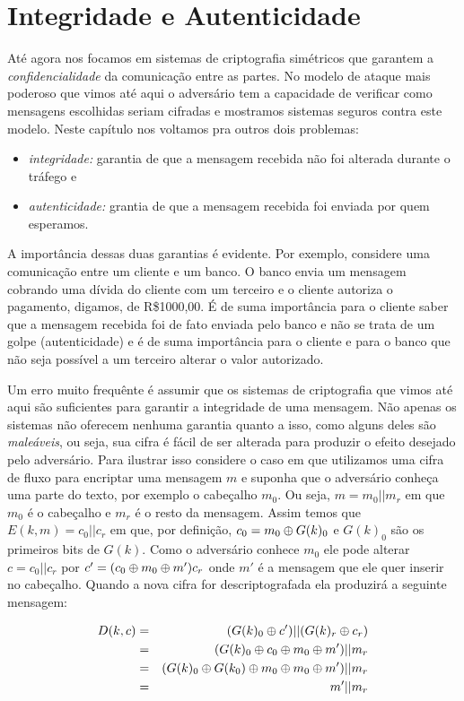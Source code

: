\chapter{Integridade e Autenticidade}
\label{cha:mac}
Até agora nos focamos em sistemas de criptografia simétricos que garantem a {\em confidencialidade} da comunicação entre as partes.
No modelo de ataque mais poderoso que vimos até aqui o adversário tem a capacidade de verificar como mensagens escolhidas seriam cifradas e mostramos sistemas seguros contra este modelo.
Neste capítulo nos voltamos pra outros dois problemas:
\begin{itemize}
\item {\em integridade:} garantia de que a mensagem recebida não foi alterada durante o tráfego e
\item {\em autenticidade:} grantia de que a mensagem recebida foi enviada por quem esperamos.
\end{itemize}

A importância dessas duas garantias é evidente.
Por exemplo, considere uma comunicação entre um cliente e um banco.
O banco envia um mensagem cobrando uma dívida do cliente com um terceiro e o cliente autoriza o pagamento, digamos, de R\$1000,00.
É de suma importância para o cliente saber que a mensagem recebida foi de fato enviada pelo banco e não se trata de um golpe (autenticidade) e é de suma importância para o cliente e para o banco que não seja possível a um terceiro alterar o valor autorizado.

Um erro muito frequênte é assumir que os sistemas de criptografia que vimos até aqui são suficientes para garantir a integridade de uma mensagem.
Não apenas os sistemas não oferecem nenhuma garantia quanto a isso, como alguns deles são {\em maleáveis}, ou seja, sua cifra é fácil de ser alterada para produzir o efeito desejado pelo adversário.
Para ilustrar isso considere o caso em que utilizamos uma cifra de fluxo para encriptar uma mensagem $m$ e suponha que o adversário conheça uma parte do texto, por exemplo o cabeçalho $m_0$.
Ou seja, $m = m_0||m_r$ em que $m_0$ é o cabeçalho e $m_r$ é o resto da mensagem.
Assim temos que $E(k, m) = c_0||c_r$ em que, por definição, $c_0 = m_0 \oplus G(k)_0$ e $G(k)_0$ são os primeiros bits de $G(k)$.
Como o adversário conhece $m_0$ ele pode alterar $c = c_0||c_r$ por $c' = (c_0 \oplus m_0 \oplus m')c_r$ onde $m'$ é a mensagem que ele quer inserir no cabeçalho.
Quando a nova cifra for descriptografada ela produzirá a seguinte mensagem:

\begin{eqnarray*}
  D(k,c) & = & (G(k)_0 \oplus c')||(G(k)_r \oplus c_r)\\
         & = & (G(k)_0 \oplus c_0 \oplus m_0 \oplus m')||m_r\\
         & = & (G(k)_0 \oplus G(k_0) \oplus m_0 \oplus m_0 \oplus m')||m_r\\
         & = & m'||m_r
\end{eqnarray*}

